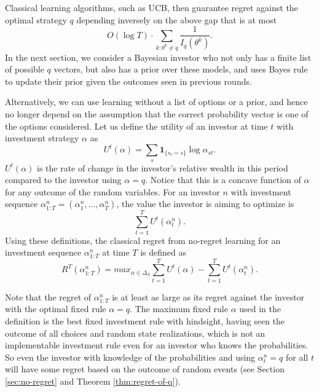 Classical learning algorithms, such as UCB, then guarantee regret against the optimal strategy $q$ depending inversely on the above gap that is at most 
\begin{equation}
 O(\log T) \cdot\sum_{k:\theta^k\neq q}\frac{1}{I_q(\theta^k)}.  
\end{equation}
In the next section, we consider a Bayesian investor who not only has a finite list of possible $q$ vectors, but also has a prior over these models, and uses Bayes rule to update their prior given the outcomes seen in previous rounds.  

Alternatively, we can use learning without a list of options or a prior, and  hence no longer depend on the assumption that the correct probability vector is one of the options considered. Let us define the utility of an investor at time $t$ with investment strategy $\alpha$ as 
\begin{equation}
    U^t(\alpha)=\sum_s \mathbf{1}_{\{s_t = s\}} \log \alpha_{st}.
\end{equation}
$U^t(\alpha)$ is the rate of change in the investor's relative wealth in this period compared to the investor using $\alpha=q$.
Notice that this is a concave function of $\alpha$ for any outcome of the random variables. For an investor $n$ with investment sequence $\alpha^n_{1:T}=(\alpha^n_1, 
\ldots, \alpha^n_T)$, the value the investor is aiming to optimize is
\begin{equation}
\sum_{t=1}^{T}U^t(\alpha^n_t).
\end{equation}
Using these definitions, the classical regret from no-regret learning for an investment sequence $\alpha_{1:T}^n$ at time $T$ is defined as 
\begin{equation}
    R^T(\alpha_{1:T}^n)=max_{\alpha\in \Delta_S} \sum_{t=1}^T U^t(\alpha)-\sum_{t=1}^T U^t(\alpha^n_t).
\end{equation}

Note that the regret of $\alpha^n_{1:T}$ is at least as large as its regret against the investor with the optimal fixed rule $\alpha=q$. 
The maximum fixed rule $\alpha$ used in the definition is the best fixed investment rule with hindsight, having seen the outcome of all choices and random state realizations, which is not an implementable investment rule even for an investor who knows the probabilities. So even the investor with knowledge of the probabilities and using $\alpha^n_t = q$ for all $t$ will have some regret based on the outcome of random events (see Section \ref{sec:no-regret} and Theorem \ref{thm:regret-of-q}).

